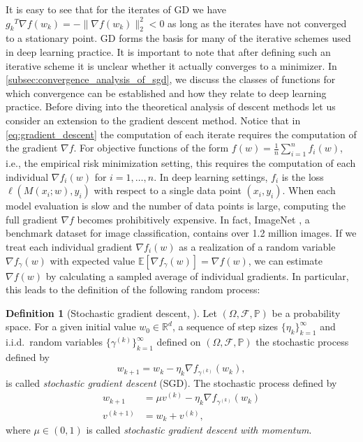 \documentclass[12pt]{article}
\theoremstyle{definition}
\newtheorem{definition}[definition]{Definition}
\numberwithin{equation}{section}
\newcommand{\R}{\mathbb{R}}
\newcommand{\BP}{\mathbb{P}}
\newcommand{\CF}{\mathcal{F}}
\newcommand{\ev}[1]{\mathbb{E}\left[{#1}\right]}
\newcommand{\norm}[1]{\lVert{#1}\rVert_2}
\begin{document}
It is easy to see that for the iterates of GD we have ${g_k}^T \nabla f(w_{k}) = -\norm{ \nabla f(w_{k}) }^2 < 0$ as long as the iterates have not converged to a stationary point. GD forms the basis for many of the iterative schemes used in deep learning practice. It is important to note that after defining such an iterative scheme it is unclear whether it actually converges to a minimizer. In \autoref{subsec:convergence_analysis_of_sgd}, we discuss the classes of functions for which convergence can be established and how they relate to deep learning practice. Before diving into the theoretical analysis of descent methods let us consider an extension to the gradient descent method.
Notice that in \eqref{eq:gradient_descent} the computation of each iterate requires the computation of the gradient $\nabla f$. For objective functions of the form $f(w) = \frac{1}{n} \sum_{i=1}^n f_i(w)$, i.e., the empirical risk minimization setting, this requires the computation of each individual $\nabla f_i(w)$ for $i = 1, \dots, n$. In deep learning settings, $f_i$ is the loss $\ell(M(x_i;w), y_i)$ with respect to a single data point $(x_i, y_i)$. When each model evaluation is slow and the number of data points is large, computing the full gradient $\nabla f$ becomes prohibitively expensive. In fact, ImageNet \cite{dengImageNetLargescaleHierarchical2009}, a benchmark dataset for image classification, contains over 1.2 million images. If we treat each individual gradient $\nabla f_i(w)$ as a realization of a random variable $\nabla f_{\gamma}(w)$ with expected value $\ev{\nabla f_{\gamma}(w)} = \nabla f(w)$, we can estimate $\nabla f(w)$ by calculating a sampled average of individual gradients. In particular, this leads to the definition of the following random process:
\begin{definition}[Stochastic gradient descent, ]
  \label{def:sgd}
 Let $(\Omega, \CF, \BP)$ be a probability space. For a given initial value $w_{0} \in \R^d$, a sequence of step sizes $\{\eta_k\}_{k=1}^\infty$ and i.i.d.\ random variables $\{\gamma^{(k)}\}_{k=1}^\infty$ defined on $(\Omega, \CF, \BP)$ the stochastic process defined by
  \begin{equation}
    \label{eq:stochastic_gradient_descent}
    w_{k+1} = w_{k} - \eta_k \nabla f_{\gamma^{(k)}}(w_{k}),
  \end{equation}
  is called \emph{stochastic gradient descent} (SGD).
  The stochastic process defined by
  \begin{align*}
    w_{k+1} &= \mu v^{(k)} - \eta_k \nabla f_{\gamma^{(k)}}(w_{k}) \\
    v^{(k+1)} &= w_{k} + v^{(k)},
  \end{align*}
  where $\mu \in (0,1)$ is called \emph{stochastic gradient descent with momentum}. 
\end{definition}
\end{document}
